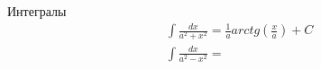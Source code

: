 Интегралы
\begin{equation}
    \begin{aligned}
        &\int\frac{dx}{a^2 + x^2} = \frac{1}{a} arctg\left(\frac{x}{a}\right) + C \\
        &\int \frac{dx}{a^2 - x^2} = \\
    \end{aligned}
\end{equation}